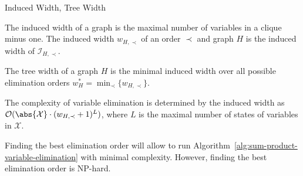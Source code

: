 \begin{frame}{Induced Width, Tree Width}
    \begin{definition}
        The induced width of a graph is the maximal number of variables in a clique minus one.
        The induced width $w_{H,\prec}$ of an order $\prec$ and graph $H$ is the induced width of $\mathcal{I}_{H,\prec}$.
    \end{definition}
    \pause
    \begin{definition}
       The tree width of a graph $H$ is the minimal induced width over all possible elimination orders $w^*_H = \min_{\prec} \{ w_{H,\prec} \}$.
    \end{definition}
    \pause
    \begin{remark}
        The complexity of variable elimination is determined by the induced width as $\mathcal{O}(\abs{\mathcal{X}} \cdot (w_{H,\prec} + 1)^L)$, where $L$ is the maximal number of states of variables in $\mathcal{X}$.
    \end{remark}
    \pause
    \begin{remark}
        Finding the best elimination order will allow to run Algorithm~\ref{alg:sum-product-variable-elimination} with minimal complexity.
        However, finding the best elimination order is NP-hard.
    \end{remark}
\end{frame}

